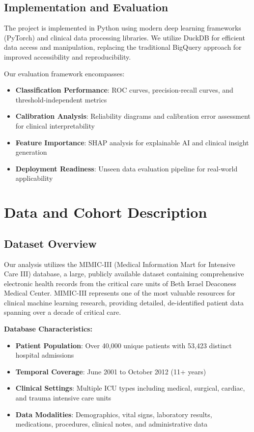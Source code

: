 \documentclass[11pt]{article}
\begin{document}
\subsection{Implementation and Evaluation}

The project is implemented in Python using modern deep learning frameworks (PyTorch) and clinical data processing libraries. We utilize DuckDB for efficient data access and manipulation, replacing the traditional BigQuery approach for improved accessibility and reproducibility.

Our evaluation framework encompasses:
\begin{itemize}
    \item \textbf{Classification Performance}: ROC curves, precision-recall curves, and threshold-independent metrics
    \item \textbf{Calibration Analysis}: Reliability diagrams and calibration error assessment for clinical interpretability
    \item \textbf{Feature Importance}: SHAP analysis for explainable AI and clinical insight generation
    \item \textbf{Deployment Readiness}: Unseen data evaluation pipeline for real-world applicability
\end{itemize}

\section{Data and Cohort Description}

\subsection{Dataset Overview}

Our analysis utilizes the MIMIC-III (Medical Information Mart for Intensive Care III) database, a large, publicly available dataset containing comprehensive electronic health records from the critical care units of Beth Israel Deaconess Medical Center. MIMIC-III represents one of the most valuable resources for clinical machine learning research, providing detailed, de-identified patient data spanning over a decade of critical care.

\textbf{Database Characteristics:}
\begin{itemize}
    \item \textbf{Patient Population}: Over 40,000 unique patients with 53,423 distinct hospital admissions
    \item \textbf{Temporal Coverage}: June 2001 to October 2012 (11+ years)
    \item \textbf{Clinical Settings}: Multiple ICU types including medical, surgical, cardiac, and trauma intensive care units
    \item \textbf{Data Modalities}: Demographics, vital signs, laboratory results, medications, procedures, clinical notes, and administrative data
\end{itemize}
\end{document}
